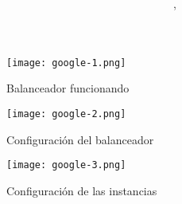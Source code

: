 \documentclass{article}
\author{\nombre , \carnet}
\title{\textbf{\Huge\titulo}}
\begin{document}
\maketitle

\begin{figure}[h]
        \texttt{[image: google-1.png]}
                 \caption{Balanceador funcionando}
\end{figure}	
\pagebreak
\begin{figure}[h]
        \texttt{[image: google-2.png]}
                 \caption{Configuración del balanceador}
\end{figure}
\pagebreak

\begin{figure}[h]
        \texttt{[image: google-3.png]}
                 \caption{Configuración de las instancias}
\end{figure}
\end{document}
